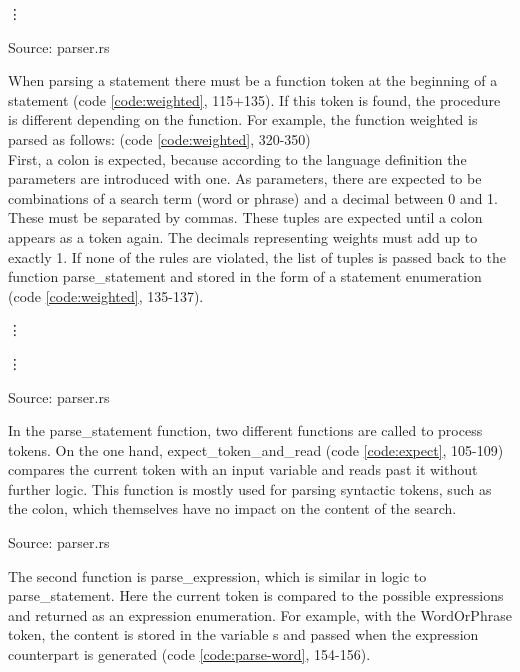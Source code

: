 \begin{codeenv}
    \label{code:read}
    
    \vdots
    
    \centerline{Source: parser.rs}
\end{codeenv}
When parsing a statement there must be a function token at the beginning of a statement (code \ref{code:weighted}, 115+135). If this token is found, the procedure is different depending on the function. For example, the function weighted is parsed as follows: (code \ref{code:weighted}, 320-350)\\
First, a colon is expected, because according to the language definition the parameters are introduced with one. As parameters, there are expected to be combinations of a search term (word or phrase) and a decimal between 0 and 1. These must be separated by commas. These tuples are expected until a colon appears as a token again. The decimals representing weights must add up to exactly 1. If none of the rules are violated, the list of tuples is passed back to the function parse\_statement and stored in the form of a statement enumeration (code \ref{code:weighted}, 135-137).
\begin{codeenv}
    \label{code:weighted}
    
    \vdots
    
    \vdots
    
    \centerline{Source: parser.rs}
\end{codeenv}
In the parse\_statement function, two different functions are called to process tokens. On the one hand, expect\_token\_and\_read (code \ref{code:expect}, 105-109) compares the current token with an input variable and reads past it without further logic. This function is mostly used for parsing syntactic tokens, such as the colon, which themselves have no impact on the content of the search.
\begin{codeenv}
    \label{code:expect}
    
    \centerline{Source: parser.rs}
\end{codeenv}
The second function is parse\_expression, which is similar in logic to parse\_statement. Here the current token is compared to the possible expressions and returned as an expression enumeration. For example, with the WordOrPhrase token, the content is stored in the variable s and passed when the expression counterpart is generated (code \ref{code:parse-word}, 154-156).
